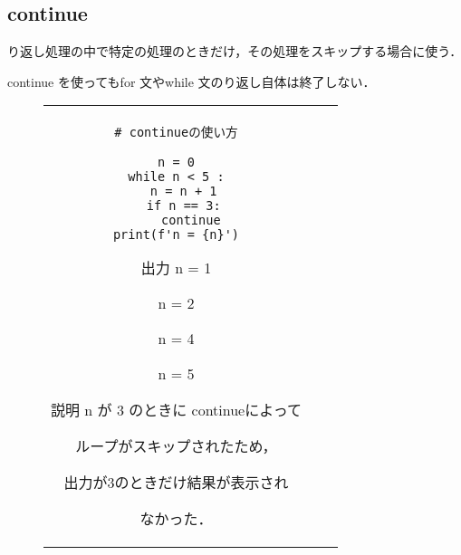 \documentclass{jsarticle}
\begin{document}
\subsection{continue}
り返し処理の中で特定の処理のときだけ，その処理をスキップする場合に使う． \par
continue を使ってもfor 文やwhile 文のり返し自体は終了しない．
\begin{figure}[h]
	\begin{tabular}{ccc}
		\begin{minipage}[t]{.45\textwidth}
			\begin{lstlisting}[caption=continue の使い方]
# continueの使い方

n = 0
while n < 5 :
  n = n + 1
  if n == 3:
    continue
  print(f'n = {n}')  \end{lstlisting}
		\end{minipage} \hspace{5mm}
		\begin{minipage}[t]{.1\textwidth}
			\begin{itembox}[l]{出力}
				n = 1 \par
				n = 2 \par
				n = 4 \par
				n = 5 \par
			\end{itembox}
		\end{minipage} \hspace{5mm}
		\begin{minipage}[t]{.4\textwidth}
			\begin{itembox}[l]{説明}
				n が 3 のときに continueによって\par ループがスキップされたため，\par
				出力が3のときだけ結果が表示され \par なかった．
			\end{itembox}
		\end{minipage}
	\end{tabular}
\end{figure}
\end{document}
